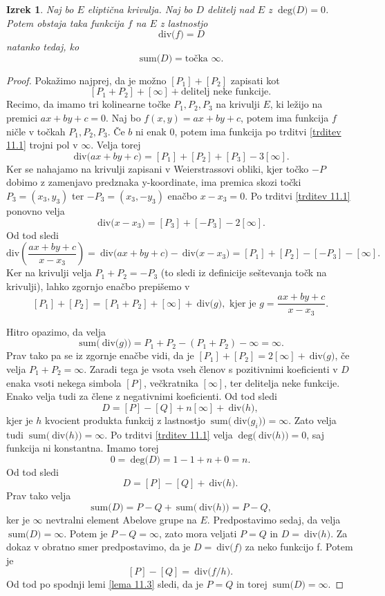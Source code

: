 \documentclass[12pt,a4paper,twoside]{article}
\theoremstyle{definition} %
\theoremstyle{plain} %
\newtheorem{izrek}[definicija]{Izrek}
\numberwithin{equation}{section}  %
\newcommand{\DEG}[1]{\ \text{deg(}{#1}\text{)}}
\newcommand{\Div}[1]{\ \text{div(}{#1}\text{)}}
\newcommand{\SUM}[1]{\ \text{sum(}{#1}\text{)}}
\begin{document}
\begin{izrek}
\label{izrek 11.2}
Naj bo $E$ eliptična krivulja. Naj bo $D$ delitelj nad $E$ z $\DEG{D} = 0$. Potem obstaja taka funkcija $f$ na $E$ z lastnostjo
$$\Div{f} = D$$
natanko tedaj, ko
$$\SUM{D} = \text{točka }\infty.$$

\end{izrek}

\begin{proof}
Pokažimo najprej, da je možno $[P_1]+ [P_2]$ zapisati kot $$[P_1+P_2] + [\infty] + \text{delitelj neke funkcije}.$$
Recimo, da imamo tri kolinearne točke $P_1,P_2,P_3$ na krivulji $E$, ki ležijo na premici $ax+by+c = 0$.
Naj bo $f(x,y) = ax+by+c$, potem ima funkcija $f$ ničle v točkah $P_1,P_2,P_3$. Če $b$ ni enak $0$, potem ima funkcija po trditvi \ref{trditev 11.1} trojni pol v $\infty$.
Velja torej $$\Div{ax+by+c} = [P_1]+[P_2]+[P_3]-3[\infty].$$
Ker se nahajamo na krivulji zapisani v Weierstrassovi obliki, kjer točko $-P$ dobimo z zamenjavo predznaka y-koordinate, ima premica skozi točki $P_3 = (x_3,y_3)$ ter $-P_3=(x_3,-y_3)$ enačbo $x-x_3=0$.
Po  trditvi \ref{trditev 11.1} ponovno velja
$$\Div{x-x_3} = [P_3]+[-P_3]-2[\infty].$$
Od tod sledi
$$\text{div}\left( \frac{ax+by+c}{x-x_3}\right) = \Div{ax+by+c} - \Div{x-x_3} =[P_1]+[P_2]-[-P_3]-[\infty].$$
Ker na krivulji velja $P_1+P_2 = -P_3$ (to sledi iz definicije seštevanja točk na krivulji), lahko zgornjo enačbo prepišemo v 
$$[P_1]+[P_2] = [P_1+P_2]+[\infty]+\Div{g}, \text{ kjer je } g=\frac{ax+by+c}{x-x_3}.$$ 


Hitro opazimo, da velja
$$\SUM{\Div{g}}= P_1+P_2-(P_1+P_2)-\infty = \infty.$$
Prav tako pa se iz zgornje enačbe vidi, da je $[P_1]+[P_2] = 2[\infty] + \Div{g}$, če velja $P_1+P_2 = \infty$. Zaradi tega je vsota vseh členov s pozitivnimi koeficienti v $D$ enaka vsoti nekega simbola $[P]$, večkratnika $[\infty]$, ter delitelja neke funkcije. Enako velja tudi za člene z negativnimi koeficienti. Od tod sledi
$$D = [P]-[Q]+n[\infty]+\Div{h},$$
kjer je $h$ kvocient produkta funkcij z lastnostjo $\SUM{\Div{g_i}} = \infty$. Zato velja tudi
\newline $\SUM{\Div{h}}= \infty$. Po trditvi \ref{trditev 11.1} velja $\DEG{\Div{h}}=0$, saj funkcija ni konstantna. Imamo torej $$0 = \DEG{D} = 1-1+n+0=n.$$
Od tod sledi
$$D = [P]-[Q] + \Div{h}.$$
Prav tako velja
$$\SUM{D} = P-Q+\SUM{\Div{h}} = P-Q,$$
ker je $\infty$ nevtralni element Abelove grupe na $E$.
Predpostavimo sedaj, da velja $\SUM{D} = \infty$. Potem je $P-Q = \infty$, zato mora veljati $P=Q$ in $D = \Div{h}$. Za dokaz v obratno smer predpostavimo, da je $D = \Div{f}$ za neko funkcijo f. Potem je
$$[P]-[Q] = \Div{f/h}.$$
Od tod po spodnji lemi \ref{lema 11.3} sledi, da je $P = Q$ in torej $\SUM{D} = \infty$.

\end{proof}
\end{document}
